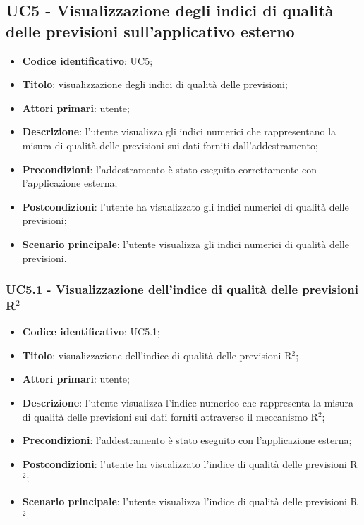 \subsection{UC5 - Visualizzazione degli indici di qualità delle previsioni sull'applicativo esterno}
\begin{itemize}
	\item \textbf{Codice identificativo}: UC5;
	\item \textbf{Titolo}: visualizzazione degli indici di qualità delle previsioni;
	\item \textbf{Attori primari}: utente;
	\item \textbf{Descrizione}: l'utente visualizza gli indici numerici che rappresentano la misura di qualità delle previsioni sui dati forniti dall'addestramento;
	\item \textbf{Precondizioni}: l'addestramento è stato eseguito correttamente con l'applicazione esterna;
	\item \textbf{Postcondizioni}: l'utente ha visualizzato gli indici numerici di qualità delle previsioni;
	\item \textbf{Scenario principale}: l'utente visualizza gli indici numerici di qualità delle previsioni.
\end{itemize} 
\subsubsection{UC5.1 - Visualizzazione dell'indice di qualità delle previsioni R$^{2}$}
\begin{itemize}
	\item \textbf{Codice identificativo}: UC5.1;
	\item \textbf{Titolo}: visualizzazione dell'indice di qualità delle previsioni R$^{2}$\glo;
	\item \textbf{Attori primari}: utente;
	\item \textbf{Descrizione}: l'utente visualizza l'indice numerico che rappresenta la misura di qualità delle previsioni sui dati forniti attraverso il meccanismo R$^{2}$\glo;
	\item \textbf{Precondizioni}: l'addestramento è stato eseguito con l'applicazione esterna;
	\item \textbf{Postcondizioni}: l'utente ha visualizzato l'indice di qualità delle previsioni R$^{2}$\glo;
	\item \textbf{Scenario principale}: l'utente visualizza l'indice di qualità delle previsioni R$^{2}$\glo.
\end{itemize} 
